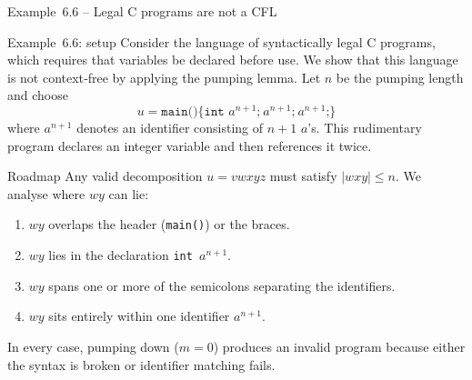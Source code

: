 \begin{frame}[t]{Example 6.6 – Legal C programs are not a CFL}
  \begin{texample}{Example 6.6: setup}
    Consider the language of syntactically legal C programs, which
    requires that variables be declared before use.  We show that this
    language is not context‑free by applying the pumping lemma.  Let
    $n$ be the pumping length and choose
    \[
      u = \texttt{main()\{int\ } a^{n+1} \texttt{;}\ a^{n+1}\texttt{;}\ a^{n+1}\texttt{;}\}
    \]
    where $a^{n+1}$ denotes an identifier consisting of $n+1$ $a$’s.
    This rudimentary program declares an integer variable and then
    references it twice.
  \end{texample}
  \begin{tblock}{Roadmap}
    Any valid decomposition $u=v w x y z$ must satisfy $|w x y| \le n$.
    We analyse where $w y$ can lie:
    \begin{enumerate}
      \item $w y$ overlaps the header (\texttt{main()}) or the braces.
      \item $w y$ lies in the declaration \texttt{int\ }$a^{n+1}$.
      \item $w y$ spans one or more of the semicolons separating the
        identifiers.
      \item $w y$ sits entirely within one identifier $a^{n+1}$.
    \end{enumerate}
    In every case, pumping down ($m=0$) produces an invalid program
    because either the syntax is broken or identifier matching fails.
  \end{tblock}
  \label{fr:6.1-20}
\end{frame}

